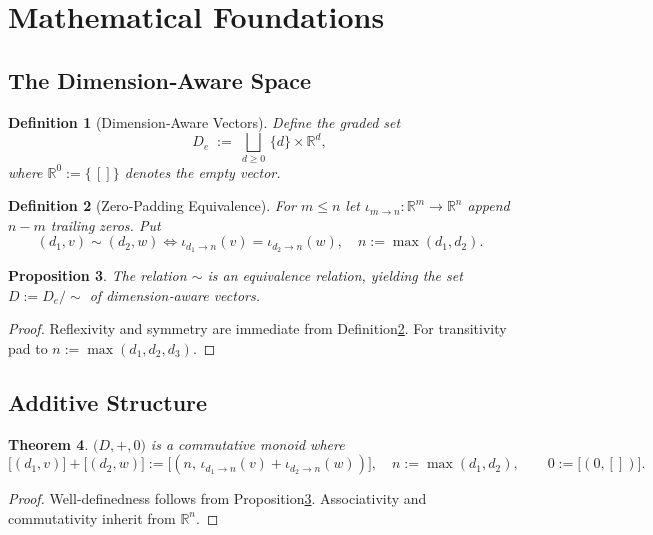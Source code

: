 \documentclass[11pt]{article}
\newtheorem{theorem}{Theorem}[section]
\newtheorem{proposition}[theorem]{Proposition}
\newtheorem{definition}[theorem]{Definition}
\begin{document}
\section{Mathematical Foundations}
\label{sec:foundations}
\subsection{The Dimension‑Aware Space}
\begin{definition}[Dimension‑Aware Vectors]\label{def:DAspace}
Define the graded set
\[
  D_e\;:=\;\bigsqcup_{d\ge0}\,\{d\}\times\mathbb R^{d},
\]
where \(\mathbb R^{0}:=\{\,[]\}\) denotes the empty vector.
\end{definition}

\begin{definition}[Zero‑Padding Equivalence]\label{def:padding}
For \(m\le n\) let \(\iota_{m\rightarrow n}\colon\mathbb R^{m}\to\mathbb R^{n}\) append \(n-m\) trailing zeros.  Put
\[
  (d_1,v)\sim(d_2,w)
  \iff \iota_{d_1\rightarrow n}(v)=\iota_{d_2\rightarrow n}(w),\quad n:=\max(d_1,d_2).
\]
\end{definition}

\begin{proposition}\label{prop:equiv}
The relation \(\sim\) is an equivalence relation, yielding the set \(D:=D_e/\!\sim\) of \emph{dimension‑aware vectors}.
\end{proposition}
\begin{proof}
Reflexivity and symmetry are immediate from Definition\;\ref{def:padding}.  For transitivity pad to \(n:=\max(d_1,d_2,d_3)\).\qedhere
\end{proof}

\subsection{Additive Structure}
\begin{theorem}\label{thm:add}
\(\bigl(D,+,0\bigr)\) is a commutative monoid where
\[
  \bigl[(d_1,v)\bigr]+\bigl[(d_2,w)\bigr]
  :=\bigl[(n,\,\iota_{d_1\rightarrow n}(v)+\iota_{d_2\rightarrow n}(w))\bigr],
  \quad n:=\max(d_1,d_2),\qquad
  0:=\bigl[(0,[])\bigr].
\]
\end{theorem}
\begin{proof}
Well‑definedness follows from Proposition\;\ref{prop:equiv}. Associativity and commutativity inherit from \(\mathbb R^n\).\qedhere
\end{proof}
\end{document}
